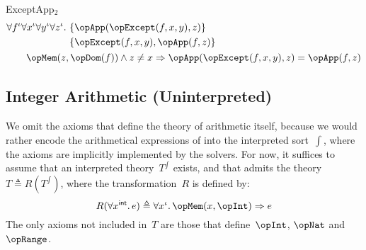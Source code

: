 \documentclass[11pt, a4paper, oneside]{article}
\begin{document}
\begin{axioms}
\item[ExceptApp$_2$] \[
        \begin{aligned}
            &\forall f^\idv \forall x^\idv \forall y^\idv \forall z^\idv.\, \begin{aligned}[t]
                &\st{ \opApp(\opExcept(f, x, y), z) } \\
                &\st{ \opExcept(f, x, y), \opApp(f, z) }
            \end{aligned} \\
            &\qquad \opMem(z, \opDom(f)) \wedge z \neq x \imp \opApp(\opExcept(f, x, y), z) = \opApp(f, z)
        \end{aligned}
    \]

\end{axioms}


    \subsection{Integer Arithmetic (Uninterpreted)}
    \label{subsec:ints_uninterpreted}

We omit the axioms that define the theory of arithmetic itself, because we would rather encode the arithmetical expressions of \TLA into the interpreted sort~$\int$, where the axioms are implicitly implemented by the solvers.  For now, it suffices to assume that an interpreted theory~$T^\int$ exists, and that \TLA admits the theory $T \triangleq R(T^\int)$, where the transformation~$R$ is defined by: \[
    R(\forall x^\int.\, e) \triangleq \forall x^\idv.\, \opMem(x, \opInt) \imp e
\] The only axioms not included in~$T$ are those that define~$\opInt$, $\opNat$ and $\opRange$.
\end{document}
